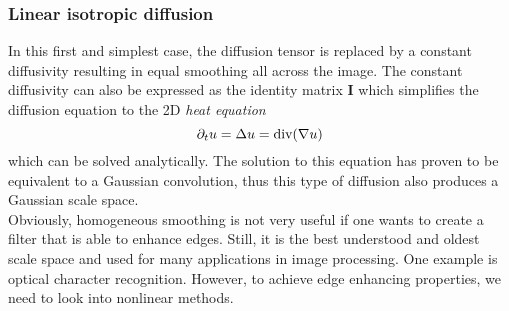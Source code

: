 \subsubsection*{Linear isotropic diffusion}
In this first and simplest case, the diffusion tensor is replaced by a constant diffusivity
resulting in equal smoothing all across the image. The constant diffusivity can also be expressed
as the identity matrix $\boldsymbol I$ which simplifies the diffusion equation to the 2D\textit{
heat equation}
\begin{equation}
    \partial_t u = \Delta u = \textnormal{div}(\mathbf{\nabla} u)\label{eq:IsoDiff}
\end{equation}
which can be solved analytically. The solution to this equation has proven to be equivalent to
a Gaussian convolution, thus this type of diffusion also produces a Gaussian scale space.\\
Obviously, homogeneous smoothing is not very useful if one wants to create a filter that is able to
enhance edges. Still, it is the best understood and oldest scale space and used for many
applications in image processing. One example is optical character recognition.
However, to achieve edge enhancing properties, we need to look into nonlinear methods.

